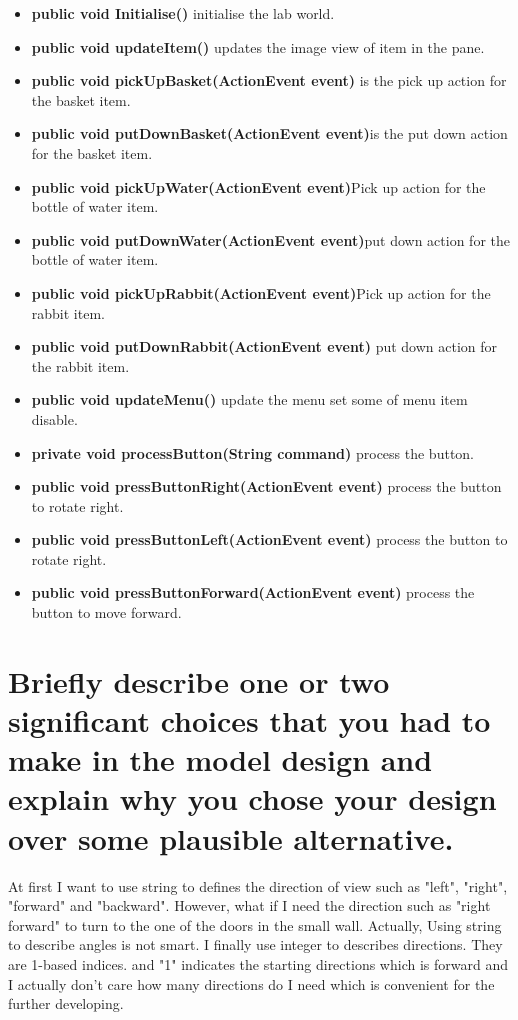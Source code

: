 \documentclass[11pt]{article}
\begin{document}
\begin{itemize}
	\begin{itemize}
		\item {\bf 	public void Initialise() } initialise the lab world.
		\item {\bf public void updateItem()} updates the image view of item in the pane.
		\item {\bf public void pickUpBasket(ActionEvent event)} is the pick up action for the basket item.
		\item {\bf public void putDownBasket(ActionEvent event)}is the put down action for the basket item.
		\item {\bf public void pickUpWater(ActionEvent event)}Pick up action for the bottle of water item.
		\item {\bf public void putDownWater(ActionEvent event)}put down action for the bottle of water item.
		\item {\bf public void pickUpRabbit(ActionEvent event)}Pick up action for the rabbit item.
		\item {\bf public void putDownRabbit(ActionEvent event)} put down action for the rabbit item.
		\item {\bf public void updateMenu()} update the menu set some of menu item disable.
		\item {\bf private void processButton(String command)} process the button.
		\item {\bf public void pressButtonRight(ActionEvent event) } process the button to rotate right.
		\item {\bf public void pressButtonLeft(ActionEvent event) } process the button to rotate right.
		\item {\bf public void pressButtonForward(ActionEvent event)} process the button to move forward.
	\end{itemize}
\end{itemize}

\section{Briefly describe one or two significant choices that you had to make in the model design and explain why you chose your design over some plausible alternative.}
At first I want to use string to defines the direction of view such as "left", "right", "forward" and "backward". However, what if I need the direction such as "right forward" to turn to the one of the doors in the small wall. Actually, Using string to describe angles is not smart. I finally use integer to describes directions. They are 1-based indices. and "1" indicates the starting directions which is forward and I actually don't care how many directions do I need which is convenient for the further developing.
\end{document}
